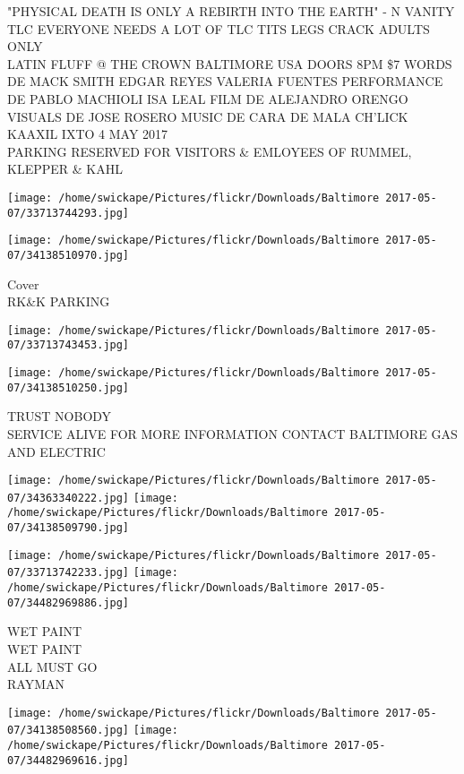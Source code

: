 \documentclass[10pt,letterpaper]{article}
\begin{document}
"PHYSICAL DEATH IS ONLY A REBIRTH INTO THE EARTH" {-} N VANITY\\
TLC EVERYONE NEEDS A LOT OF TLC TITS LEGS CRACK ADULTS ONLY\\
LATIN FLUFF @ THE CROWN BALTIMORE USA DOORS 8PM \$7 WORDS DE MACK SMITH EDGAR REYES VALERIA FUENTES PERFORMANCE DE PABLO MACHIOLI ISA LEAL FILM DE ALEJANDRO ORENGO VISUALS DE JOSE ROSERO MUSIC DE CARA DE MALA CH'LICK KAAXIL IXTO 4 MAY 2017\\
PARKING RESERVED FOR VISITORS \& EMLOYEES OF RUMMEL, KLEPPER \& KAHL\\
\pagebreak

\texttt{[image: /home/swickape/Pictures/flickr/Downloads/Baltimore 2017-05-07/33713744293.jpg]}

\vspace{0.25in}
\texttt{[image: /home/swickape/Pictures/flickr/Downloads/Baltimore 2017-05-07/34138510970.jpg]}

Cover\\
RK\&K PARKING\\
\pagebreak

\texttt{[image: /home/swickape/Pictures/flickr/Downloads/Baltimore 2017-05-07/33713743453.jpg]}

\vspace{0.25in}
\texttt{[image: /home/swickape/Pictures/flickr/Downloads/Baltimore 2017-05-07/34138510250.jpg]}

TRUST NOBODY\\
SERVICE ALIVE FOR MORE INFORMATION CONTACT BALTIMORE GAS AND ELECTRIC\\
\pagebreak

\texttt{[image: /home/swickape/Pictures/flickr/Downloads/Baltimore 2017-05-07/34363340222.jpg]}
\texttt{[image: /home/swickape/Pictures/flickr/Downloads/Baltimore 2017-05-07/34138509790.jpg]}

\texttt{[image: /home/swickape/Pictures/flickr/Downloads/Baltimore 2017-05-07/33713742233.jpg]}
\texttt{[image: /home/swickape/Pictures/flickr/Downloads/Baltimore 2017-05-07/34482969886.jpg]}

WET PAINT\\
WET PAINT\\
ALL MUST GO\\
RAYMAN\\
\pagebreak

\texttt{[image: /home/swickape/Pictures/flickr/Downloads/Baltimore 2017-05-07/34138508560.jpg]}
\texttt{[image: /home/swickape/Pictures/flickr/Downloads/Baltimore 2017-05-07/34482969616.jpg]}
\end{document}
